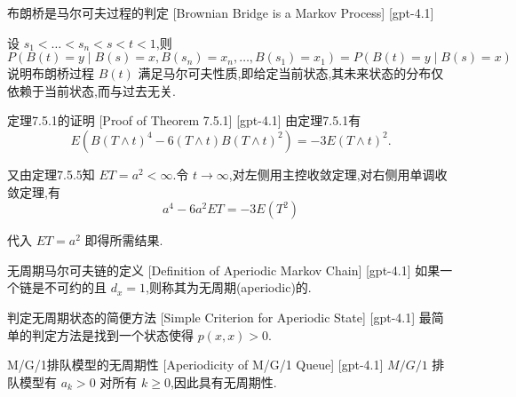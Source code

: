 \documentclass[UTF8]{ctexart}
\begin{document}
    
    
    \begin{thm}
        {布朗桥是马尔可夫过程的判定}
        [Brownian Bridge is a Markov Process]
        [gpt-4.1]
        
设 $s_1 < \ldots < s_n < s < t < 1$,则
\[
P(B(t) = y \mid B(s) = x, B(s_n) = x_n, \ldots, B(s_1) = x_1) = P(B(t) = y \mid B(s) = x)
\]
说明布朗桥过程 $B(t)$ 满足马尔可夫性质,即给定当前状态,其未来状态的分布仅依赖于当前状态,而与过去无关.

    \end{thm}
    
    
    
    \begin{prf}
        {定理7.5.1的证明}
        [Proof of Theorem 7.5.1]
        [gpt-4.1]
        由定理7.5.1有
\[
E ( B ( T \wedge t )^{4} - 6 ( T \wedge t ) B ( T \wedge t )^{2} ) = -3 E ( T \wedge t )^{2}.
\]

又由定理7.5.5知 $E T = a^{2} < \infty$.令 $t \to \infty$,对左侧用主控收敛定理,对右侧用单调收敛定理,有
\[
a^{4} - 6 a^{2} E T = -3 E ( T^{2} )
\]

代入 $E T = a^{2}$ 即得所需结果.

    \end{prf}
    
    
    
    \begin{dfn}
        {无周期马尔可夫链的定义}
        [Definition of Aperiodic Markov Chain]
        [gpt-4.1]
        如果一个链是不可约的且 $d_{x} = 1$,则称其为无周期(aperiodic)的.
    \end{dfn}
    
    
    
    \begin{ppt}
        {判定无周期状态的简便方法}
        [Simple Criterion for Aperiodic State]
        [gpt-4.1]
        最简单的判定方法是找到一个状态使得 $p(x, x) > 0$.
    \end{ppt}
    
    
    
    \begin{ppt}
        {M/G/1排队模型的无周期性}
        [Aperiodicity of M/G/1 Queue]
        [gpt-4.1]
        $M/G/1$ 排队模型有 $a_{k} > 0$ 对所有 $k \geq 0$,因此具有无周期性.
    \end{ppt}
    
\end{document}
